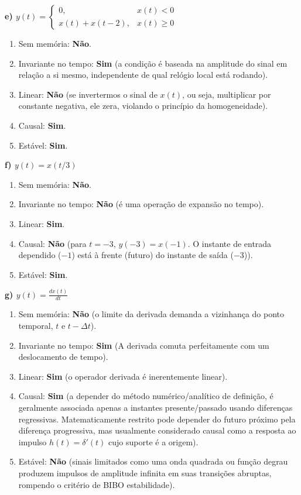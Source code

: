 \textbf{e) \(y(t) = \begin{cases} 0, & x(t) < 0 \\ x(t) + x(t-2), & x(t) \ge 0 \end{cases}\)}

\begin{enumerate}
\def\labelenumi{\arabic{enumi}.}
\tightlist
\item
  Sem memória: \textbf{Não}.
\item
  Invariante no tempo: \textbf{Sim} (a condição é baseada na amplitude do sinal em relação a si mesmo, independente de qual relógio local está rodando).
\item
  Linear: \textbf{Não} (se invertermos o sinal de \(x(t)\), ou seja, multiplicar por constante negativa, ele zera, violando o princípio da homogeneidade).
\item
  Causal: \textbf{Sim}.
\item
  Estável: \textbf{Sim}.
\end{enumerate}

\textbf{f) \(y(t) = x(t/3)\)}

\begin{enumerate}
\def\labelenumi{\arabic{enumi}.}
\tightlist
\item
  Sem memória: \textbf{Não}.
\item
  Invariante no tempo: \textbf{Não} (é uma operação de expansão no tempo).
\item
  Linear: \textbf{Sim}.
\item
  Causal: \textbf{Não} (para \(t = -3\), \(y(-3) = x(-1)\). O instante de entrada dependido (\(-1\)) está à frente (futuro) do instante de saída (\(-3\))).
\item
  Estável: \textbf{Sim}.
\end{enumerate}

\textbf{g) \(y(t) = \frac{dx(t)}{dt}\)}

\begin{enumerate}
\def\labelenumi{\arabic{enumi}.}
\tightlist
\item
  Sem memória: \textbf{Não} (o limite da derivada demanda a vizinhança do ponto temporal, \(t\) e \(t-\Delta t\)).
\item
  Invariante no tempo: \textbf{Sim} (A derivada comuta perfeitamente com um deslocamento de tempo).
\item
  Linear: \textbf{Sim} (o operador derivada é inerentemente linear).
\item
  Causal: \textbf{Sim} (a depender do método numérico/analítico de definição, é geralmente associada apenas a instantes presente/passado usando diferenças regressivas. Matematicamente restrito pode depender do futuro próximo pela diferença progressiva, mas usualmente considerado causal como a resposta ao impulso \(h(t) = \delta'(t)\) cujo suporte é a origem).
\item
  Estável: \textbf{Não} (sinais limitados como uma onda quadrada ou função degrau produzem impulsos de amplitude infinita em suas transições abruptas, rompendo o critério de BIBO estabilidade).
\end{enumerate}

